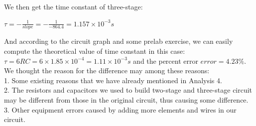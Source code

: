 \phantom{ } We then get the time constant of three-stage: 
\begin{center}
	$\tau = -\frac{1}{slope} = -\frac{1}{-864.4} = 1.157\times10^{-3}s$
\end{center}

And according to the circuit graph and some prelab exercise, we can easily compute
the theoretical value of time constant in this case:
$\tau = 6RC = 6\times1.85\times10^{-4} = 1.11\times10^{-3}s$ and the percent error $error = 4.23\%$.\\
\phantom{ } We thought the reason for the difference may among these reasons:\\
1. Some existing reasons that we have already mentioned in Analysis 4.\\
2. The resistors and capacitors we used to build two-stage and three-stage circuit may be different from those in the original circuit, thus causing some difference.\\
3. Other equipment errors caused by adding more elements and wires in our circuit.\\

